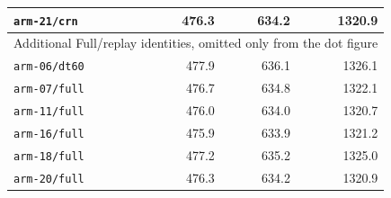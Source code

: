 \begin{longtable}{lrrr}
\texttt{arm-21/crn} & 476.3 & 634.2 & 1320.9\\
\midrule
\multicolumn{4}{l}{Additional Full/replay identities, omitted only from the dot figure}\\
\texttt{arm-06/dt60} & 477.9 & 636.1 & 1326.1\\
\texttt{arm-07/full} & 476.7 & 634.8 & 1322.1\\
\texttt{arm-11/full} & 476.0 & 634.0 & 1320.7\\
\texttt{arm-16/full} & 475.9 & 633.9 & 1321.2\\
\texttt{arm-18/full} & 477.2 & 635.2 & 1325.0\\
\texttt{arm-20/full} & 476.3 & 634.2 & 1320.9\\
\end{longtable}
\endgroup
